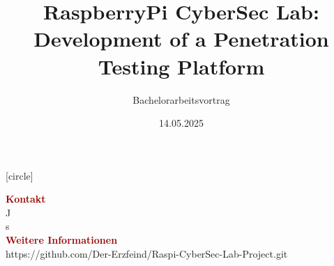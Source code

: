 \documentclass{beamer}
\title[RaspberryPi CyberSec Lab]{RaspberryPi CyberSec Lab: Development of a Penetration Testing Platform}
\subtitle{Bachelorarbeitsvortrag}
\author{}
\institute[]{betreut von}
\date{14.05.2025}
\begin{document}
[circle] 



\begin{frame}
    \titlepage
\end{frame}

\begin{frame}
    \tableofcontents
\end{frame}








\begin{frame}
    \Large\textcolor[HTML]{990000}{\textbf{Kontakt}}
    \small
    \\J
    \\s
    \\\vspace{1cm}
    \Large
    \Large\textcolor[HTML]{990000}{\textbf{Weitere Informationen}}
    \small
    \\https://github.com/Der-Erzfeind/Raspi-CyberSec-Lab-Project.git

\end{frame}
\end{document}
